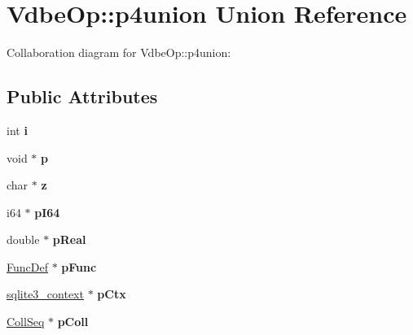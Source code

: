 \hypertarget{unionVdbeOp_1_1p4union}{}\section{Vdbe\+Op\+:\+:p4union Union Reference}
\label{unionVdbeOp_1_1p4union}


Collaboration diagram for Vdbe\+Op\+:\+:p4union\+:
\subsection*{Public Attributes}
\begin{DoxyCompactItemize}
\item 
int {\bfseries i}\hypertarget{unionVdbeOp_1_1p4union_a67b1d33cd04d43500226f2fc5cd0c6c4}{}\label{unionVdbeOp_1_1p4union_a67b1d33cd04d43500226f2fc5cd0c6c4}

\item 
void $\ast$ {\bfseries p}\hypertarget{unionVdbeOp_1_1p4union_a084b1849db2067d5aa349e3988d2f515}{}\label{unionVdbeOp_1_1p4union_a084b1849db2067d5aa349e3988d2f515}

\item 
char $\ast$ {\bfseries z}\hypertarget{unionVdbeOp_1_1p4union_ab679a57e8d973f81a8d51f925502d430}{}\label{unionVdbeOp_1_1p4union_ab679a57e8d973f81a8d51f925502d430}

\item 
i64 $\ast$ {\bfseries p\+I64}\hypertarget{unionVdbeOp_1_1p4union_a6058dda6de49e297bc89e53060e97354}{}\label{unionVdbeOp_1_1p4union_a6058dda6de49e297bc89e53060e97354}

\item 
double $\ast$ {\bfseries p\+Real}\hypertarget{unionVdbeOp_1_1p4union_a39e6887128786424eaf8dc31e7a88f66}{}\label{unionVdbeOp_1_1p4union_a39e6887128786424eaf8dc31e7a88f66}

\item 
\hyperlink{structFuncDef}{Func\+Def} $\ast$ {\bfseries p\+Func}\hypertarget{unionVdbeOp_1_1p4union_a6832dea5d3721f13f718592de2bc9b23}{}\label{unionVdbeOp_1_1p4union_a6832dea5d3721f13f718592de2bc9b23}

\item 
\hyperlink{structsqlite3__context}{sqlite3\+\_\+context} $\ast$ {\bfseries p\+Ctx}\hypertarget{unionVdbeOp_1_1p4union_aa1ca37d471aef629b85a8b3c628faa06}{}\label{unionVdbeOp_1_1p4union_aa1ca37d471aef629b85a8b3c628faa06}

\item 
\hyperlink{structCollSeq}{Coll\+Seq} $\ast$ {\bfseries p\+Coll}\hypertarget{unionVdbeOp_1_1p4union_abdd570179d6f6428b96d56b0292f068b}{}\label{unionVdbeOp_1_1p4union_abdd570179d6f6428b96d56b0292f068b}


\end{DoxyCompactItemize}

